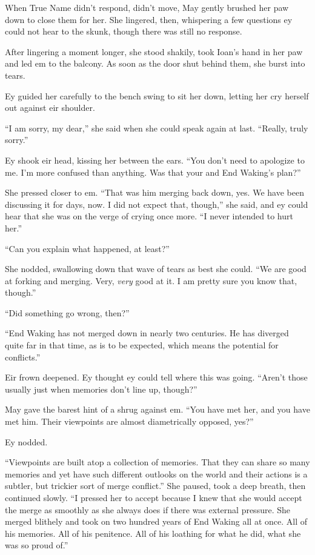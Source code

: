 When True Name didn't respond, didn't move, May gently brushed her paw down to close them for her. She lingered, then, whispering a few questions ey could not hear to the skunk, though there was still no response.

After lingering a moment longer, she stood shakily, took Ioan's hand in her paw and led em to the balcony. As soon as the door shut behind them, she burst into tears.

Ey guided her carefully to the bench swing to sit her down, letting her cry herself out against eir shoulder.

``I am sorry, my dear,'' she said when she could speak again at last. ``Really, truly sorry.''

Ey shook eir head, kissing her between the ears. ``You don't need to apologize to me. I'm more confused than anything. Was that your and End Waking's plan?''

She pressed closer to em. ``That was him merging back down, yes. We have been discussing it for days, now. I did not expect that, though,'' she said, and ey could hear that she was on the verge of crying once more. ``I never intended to hurt her.''

``Can you explain what happened, at least?''

She nodded, swallowing down that wave of tears as best she could. ``We are good at forking and merging. Very, \emph{very} good at it. I am pretty sure you know that, though.''

``Did something go wrong, then?''

``End Waking has not merged down in nearly two centuries. He has diverged quite far in that time, as is to be expected, which means the potential for conflicts.''

Eir frown deepened. Ey thought ey could tell where this was going. ``Aren't those usually just when memories don't line up, though?''

May gave the barest hint of a shrug against em. ``You have met her, and you have met him. Their viewpoints are almost diametrically opposed, yes?''

Ey nodded.

``Viewpoints are built atop a collection of memories. That they can share so many memories and yet have such different outlooks on the world and their actions is a subtler, but trickier sort of merge conflict.'' She paused, took a deep breath, then continued slowly. ``I pressed her to accept because I knew that she would accept the merge as smoothly as she always does if there was external pressure. She merged blithely and took on two hundred years of End Waking all at once. All of his memories. All of his penitence. All of his loathing for what he did, what she was so proud of.''

